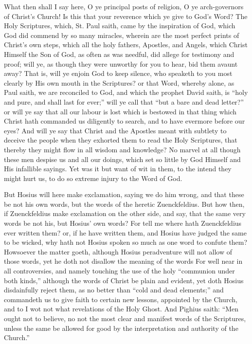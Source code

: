 What then shall I say here, O ye principal posts of religion, O ye
arch-governors of Christ’s Church! Is this that your reverence
which ye give to God’s Word? The Holy Scriptures, which,
St. Paul saith, came by the inspiration of God, which God did commend
by so many miracles, wherein are the most perfect prints of Christ’s
own steps, which all the holy fathers, Apostles, and Angels, which Christ
Himself the Son of God, as often as was needful, did allege for testimony
and proof; will ye, as though they were unworthy for you to hear, bid
them avaunt away? That is, will ye enjoin God to keep silence,
who speaketh to you most clearly by His own mouth in the Scriptures?
or that Word, whereby alone, as Paul saith, we are reconciled to God,
and which the prophet David saith, is “holy and pure, and shall
last for ever;” will ye call that “but a bare and dead letter?”
or will
ye say that all our labour is lost which is bestowed in that thing which
Christ hath commanded us diligently to search, and to have evermore
before our eyes? And will ye say that Christ and the Apostles
meant with subtlety to deceive the people when they exhorted them to
read the Holy Scriptures, that thereby they might flow in all wisdom
and knowledge? No marvel at all though these men despise us and
all our doings, which set so little by God Himself and His infallible
sayings. Yet was it but want of wit in them, to the intend they
might hurt us, to do so extreme injury to the Word of God.

But Hosius will here make exclamation, saying we do him wrong, and
that these be not his own words, but the words of the heretic Zuenckfeldius.
But how then, if Zuenckfeldius make exclamation on the other side, and
say, that the same very words be not his, but Hosius’ own words?
For tell me where hath Zuenckfeldius ever written them? or, if he have
written them, and Hosius have judged the same to be wicked, why hath
not Hosius spoken so much as one word to confute them? Howsoever
the matter goeth, although Hosius peradventure will not allow of those
words, yet he doth not disallow the meaning of the words For well near
in all controversies, and namely touching the
use of the holy “communion under both kinds,” although the
words of Christ be plain and evident, yet doth Hosius disdainfully reject
them, as no better than “cold and dead elements;” and commandeth
us to give faith to certain new lessons, appointed by the Church, and
to I wot not what revelations of the Holy Ghost. And Pighius saith:
“Men ought not to believe, no not the most clear and manifest
words of the Scriptures, unless the same be allowed for good by the
interpretation and authority of the Church.”

